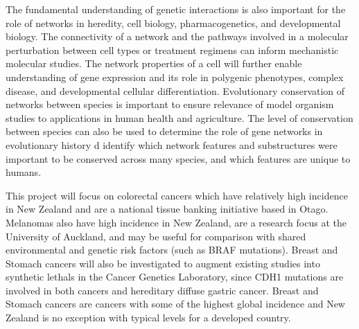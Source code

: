 The fundamental understanding of genetic interactions is also important for the role of networks in heredity, cell biology, pharmacogenetics, and developmental biology. The connectivity of a network and the pathways involved in a molecular perturbation between cell types or treatment regimens can inform mechanistic molecular studies. The network properties of a cell will further enable understanding of \gls{gene expression} and its role in polygenic phenotypes, complex disease, and developmental cellular differentiation. Evolutionary conservation of networks between species is important to ensure relevance of model organism studies to applications in human health and agriculture. The level of conservation between species can also be used to determine the role of gene networks in evolutionary history d identify which network features and substructures were important to be conserved across many species, and which features are unique to humans.

This project will focus on colorectal cancers which have relatively high incidence in New Zealand and are a national tissue banking initiative based in Otago. Melanomas also have high incidence in New Zealand, are a research focus at the University of Auckland, and may be useful for comparison with shared environmental and genetic risk factors (such as BRAF \glspl{mutation}). Breast and Stomach cancers will also be investigated to augment existing studies into \glspl{synthetic lethal} in the Cancer Genetics Laboratory, since CDH1 \glspl{mutation} are involved in both  cancers and \gls{hereditary} diffuse gastric cancer. Breast and Stomach cancers are cancers with some of the highest global incidence and New Zealand is no exception with typical levels for a developed country.



